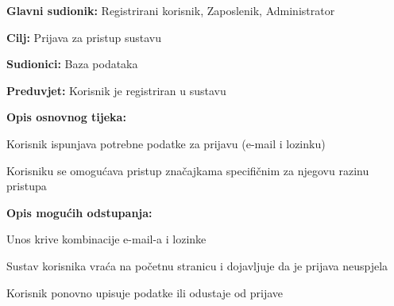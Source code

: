 \noindent {}
\begin{packed_item}
	
	\item \textbf{Glavni sudionik: } Registrirani korisnik,  Zaposlenik, Administrator
	\item  \textbf{Cilj:} Prijava za pristup sustavu
	\item  \textbf{Sudionici:} Baza podataka
	\item  \textbf{Preduvjet:} Korisnik je registriran u sustavu
	\item  \textbf{Opis osnovnog tijeka:}
	
	\item[] \begin{packed_enum}
		
		\item Korisnik ispunjava potrebne podatke za prijavu (e-mail i lozinku)
		\item Korisniku se omogućava pristup značajkama specifičnim za njegovu razinu pristupa

	\end{packed_enum}
	
	\item  \textbf{Opis mogućih odstupanja:}
	
	\item[] \begin{packed_item}
		
		\item[2.a] Unos krive kombinacije e-mail-a i lozinke
		\item[] \begin{packed_enum}
			
			\item Sustav korisnika vraća na početnu stranicu i dojavljuje da je prijava neuspjela
			\item Korisnik ponovno upisuje podatke ili odustaje od prijave
			
		\end{packed_enum}
	\end{packed_item}
\end{packed_item}


